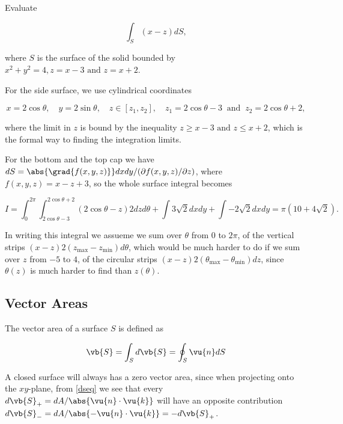 \documentclass[english,a4paper,12pt]{report}
\begin{document}
{Evaluate 

\begin{equation}
	\int_{S}^{} (x-z) dS,  
\end{equation}

where \(S\) is the surface of the solid bounded by \(x^2+y^2=4, z = x -3 \text { and } z = x+2\).  
}
{For the side surface, we use cylindrical coordinates 

\begin{equation}
	x = 2 \cos \theta , \quad y = 2 \sin \theta , \quad z \in [z_1 ,z_2 ], \quad z_1 = 2 \cos \theta - 3 ~\text { and }~ z_2 = 2 \cos \theta +2,
\end{equation}

where the limit in \(z\) is bound by the inequality \(z \ge x-3 \text { and } z \le x+2\), which is the formal way to finding the integration limits.

For the bottom and the top cap we have \(dS = \abs{\grad{f(x,y,z)} } dxdy / (\partial f (x,y,z)  / \partial z) \), where \(f(x,y,z) = x-z+3\), so the whole surface integral becomes

\begin{equation}
	I = \int_{0}^{2\pi } \int_{2 \cos \theta -3}^{2\cos \theta +2} (2 \cos \theta -z) 2dz d \theta + \int 3 \sqrt{2}dxdy + \int -2 \sqrt{2} dxdy = \pi (10+4\sqrt{2} ).        
\end{equation}

In writing this integral we assueme we sum over \(\theta \) from \(0\) to \(2\pi \), of the vertical strips \((x-z)2 (z_{\text{max} } - z_{\text{min} } ) d \theta  \), which would be much harder to do if we sum over \(z\) from \(-5\) to \(4\), of the circular strips \((x-z)2 (\theta _{\text{max} }- \theta _{\text{min} }  ) dz\), since \(\theta (z)\) is much harder to find than \(z (\theta )\).
} 



\subsection{Vector Areas}

The vector area of a surface \(S\) is defined as

\begin{equation}
	\vb{S}  = \int_{S}^{} d\vb{S} = \oint_{S} \vu{n} dS
\end{equation}

A closed surface will always has a zero vector area, since when projecting onto the \(xy\)-plane, from \cref{dseq} we see that every \( d\vb{S} _{+}  = dA/\abs{\vu{n} \cdot \vu{k} }\) will have an opposite contribution \( d\vb{S} _{-} = dA/\abs{- \vu{n} \cdot \vu{k} } = -d\vb{S} _{+} \). 
\end{document}
